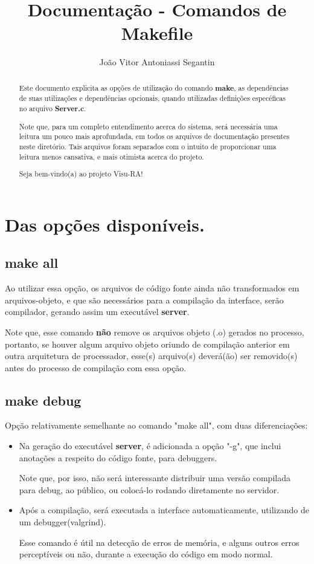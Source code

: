 \documentclass[onecolumn,12pt]{article}
\title{Documentação - Comandos de Makefile}
\author{João Vitor Antoniassi Segantin}
\begin{document}
	\maketitle
	\begin{abstract}
		Este documento explicita as opções de utilização do comando \textbf{make}, as dependências de suas utilizações e dependências opcionais, quando utilizadas definições especéficas no arquivo \textbf{Server.c}. \par
		Note que, para um completo entendimento acerca do sistema, será necessária uma leitura um pouco mais aprofundada, em todos os arquivos de documentação presentes neste diretório. Tais arquivos foram separados com o intuito de proporcionar uma leitura menos cansativa, e mais otimista acerca do projeto. \par
		Seja bem-vindo(a) ao projeto Visu-RA!
	\end{abstract}
	\newpage
	\indent
	
    \section{Das opções disponíveis.}
    
    	\subsection{make all}
    		Ao utilizar essa opção, os arquivos de código fonte ainda não transformados em arquivos-objeto, e que são necessários para a compilação da interface, serão compilador, gerando assim um executável \textbf{server}.\par
    		Note que, esse comando \textbf{não} remove os arquivos objeto (.o) gerados no processo, portanto, se houver algum arquivo objeto oriundo de compilação anterior em outra arquitetura de processador, esse(s) arquivo(s) deverá(ão) ser removido(s) antes do processo de compilação com essa opção.
    		
    		
    	\subsection{make debug}
    		Opção relativamente semelhante ao comando "make all", com duas diferenciações:
    		\begin{itemize}
    			\item Na geração do executável \textbf{server}, é adicionada a opção "-g", que inclui anotações a respeito do código fonte, para debuggers.\par
    				Note que, por isso, não será interessante distribuir uma versão compilada para debug, ao público, ou colocá-lo rodando diretamente no servidor.
    			\item Após a compilação, será executada a interface automaticamente, utilizando de um debugger(valgrind).\par
    				Esse comando é útil na detecção de erros de memória, e alguns outros erros perceptíveis ou não, durante a execução do código em modo normal.
    		\end{itemize}
    		
\end{document}
